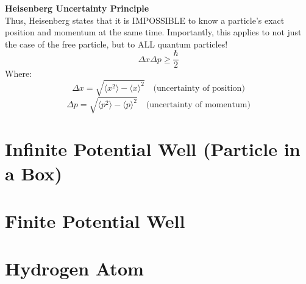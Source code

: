 \documentclass[12pt]{article}
\begin{document}
\textbf{Heisenberg Uncertainty Principle}\\
Thus, Heisenberg states that it is IMPOSSIBLE to know a particle's exact position and momentum at the same time. Importantly, this applies to not just the case of the free particle, but to ALL quantum particles!
\[\boxed{\Delta x \Delta p \geq \frac{\hbar}{2}}\]
Where:
\[\Delta x = \sqrt{\langle x^2 \rangle - \langle x \rangle^2} \quad \text{(uncertainty of position)}\]
\[\Delta p = \sqrt{\langle p^2 \rangle - \langle p \rangle^2} \quad \text{(uncertainty of momentum)}\]
\newpage
\section*{Infinite Potential Well (Particle in a Box)}

\newpage
\section*{Finite Potential Well}
\newpage
\section*{Hydrogen Atom}
\end{document}
